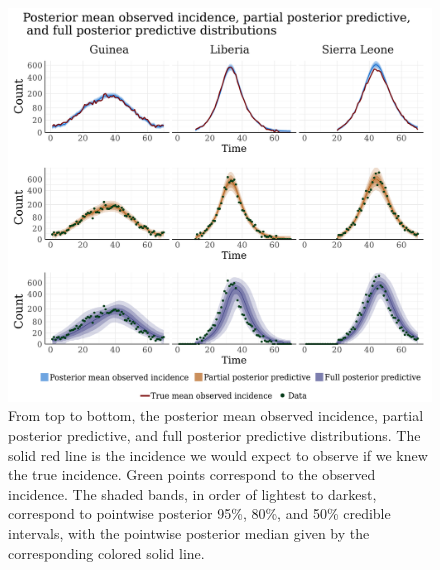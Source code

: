 \begin{figure}[htbp]
	\begin{fullpage}
		\centering
		\includegraphics[width=\linewidth]{figures/ebola_synth_diag_plots}
		\caption[Posterior mean observed incidence, partial posterior predictive, and full posterior distributions for a stratified SEIR model fit to a simulated Ebola outbreak.]{From top to bottom, the posterior mean observed incidence, partial posterior predictive, and full posterior predictive distributions. The solid red line is the incidence we would expect to observe if we knew the true incidence. Green points correspond to the observed incidence. The shaded bands, in order of lightest to darkest, correspond to pointwise posterior 95\%, 80\%, and 50\% credible intervals, with the pointwise posterior median given by the corresponding colored solid line.}
		\label{fig:ebola_synth_diags}
	\end{fullpage}
\end{figure}

